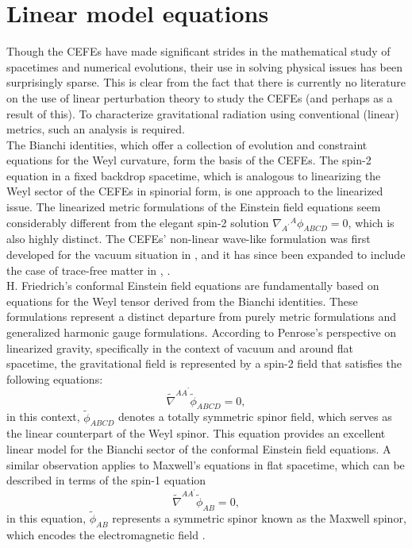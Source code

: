 \section{Linear model equations}
\label{sec:LinearModelEquations}
Though the CEFEs have made significant strides in the mathematical study of spacetimes and numerical evolutions, their use in solving physical issues has been surprisingly sparse. This is clear from the fact that there is currently no literature on the use of linear perturbation theory to study the CEFEs (and perhaps as a result of this). To characterize gravitational radiation using conventional (linear) metrics, such an analysis is required. \\

The Bianchi identities, which offer a collection of evolution and constraint equations for the Weyl curvature, form the basis of the CEFEs. The spin-2 equation in a fixed backdrop spacetime, which is analogous to linearizing the Weyl sector of the CEFEs in spinorial form, is one approach to the linearized issue. The linearized metric formulations of the Einstein field equations seem considerably different from the elegant spin-2 solution $\nabla_{A^{\prime}}{ }^A \phi_{A B C D}=0$, which is also highly distinct. The CEFEs' non-linear wave-like formulation was first developed for the vacuum situation in \cite{Pae14}, and it has since been expanded to include the case of trace-free matter in \cite{CarHurKro19}, \cite{FenGas23}. \\

H. Friedrich's conformal Einstein field equations are fundamentally based on equations for the Weyl tensor derived from the Bianchi identities. These formulations represent a distinct departure from purely metric formulations and generalized harmonic gauge formulations. According to Penrose's perspective on linearized gravity, specifically in the context of vacuum and around flat spacetime, the gravitational field is represented by a spin-2 field that satisfies the following equations:
\begin{equation}\label{eq:Spin2Eq}
  \tilde{\nabla}^{A A^{\prime}} \tilde{\phi}_{A B C D}=0,
\end{equation}
in this context, $\tilde{\phi}_{A B C D}$ denotes a totally symmetric spinor field, which serves as the linear counterpart of the Weyl spinor.
This equation provides an excellent linear model for the Bianchi sector of the conformal Einstein field equations. A similar observation applies to Maxwell's equations in flat spacetime, which can be described in terms of the spin-1 equation
\begin{equation}\label{eq:Spin1Eq}
  \tilde{\nabla}^{A A^{\prime}} \tilde{\phi}_{A B}=0,
\end{equation}
in this equation, $\tilde{\phi}_{A B}$ represents a symmetric spinor known as the Maxwell spinor, which encodes the electromagnetic field \cite{GasPin23}. \\


